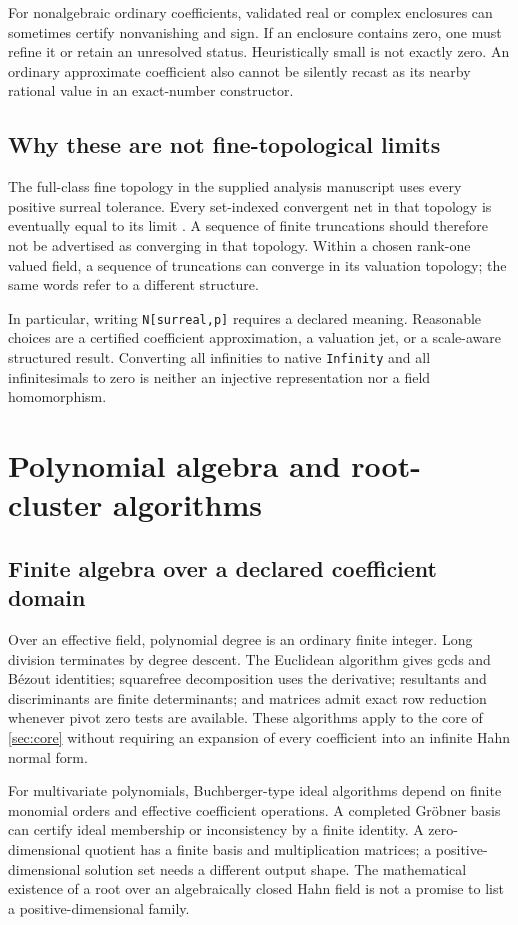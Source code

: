 \documentclass[11pt,letterpaper]{article}
\numberwithin{equation}{section}
\theoremstyle{definition}
\theoremstyle{remark}\newtheorem{remark}[theorem]{Remark}
\begin{document}
For nonalgebraic ordinary coefficients, validated real or complex enclosures
can sometimes certify nonvanishing and sign. If an enclosure contains zero,
one must refine it or retain an unresolved status. Heuristically small is not
exactly zero. An ordinary approximate coefficient also cannot be silently
recast as its nearby rational value in an exact-number constructor.

\subsection{Why these are not fine-topological limits}
The full-class fine topology in the supplied analysis manuscript uses every
positive surreal tolerance. Every set-indexed convergent net in that topology
is eventually equal to its limit \cite{SourceAnalysis}. A sequence of finite
truncations should therefore not be advertised as converging in that topology.
Within a chosen rank-one valued field, a sequence of truncations can converge
in its valuation topology; the same words refer to a different structure.

In particular, writing \texttt{N[surreal,p]} requires a declared meaning.
Reasonable choices are a certified coefficient approximation, a valuation jet,
or a scale-aware structured result. Converting all infinities to native
\texttt{Infinity} and all infinitesimals to zero is neither an injective
representation nor a field homomorphism.

\section{Polynomial algebra and root-cluster algorithms}
\label{sec:polynomials}

\subsection{Finite algebra over a declared coefficient domain}
Over an effective field, polynomial degree is an ordinary finite integer.
Long division terminates by degree descent. The Euclidean algorithm gives
gcds and B\'ezout identities; squarefree decomposition uses the derivative;
resultants and discriminants are finite determinants; and matrices admit
exact row reduction whenever pivot zero tests are available. These algorithms
apply to the core of \cref{sec:core} without requiring an expansion of every
coefficient into an infinite Hahn normal form.

For multivariate polynomials, Buchberger-type ideal algorithms depend on
finite monomial orders and effective coefficient operations. A completed
Gr\"obner basis can certify ideal membership or inconsistency by a finite
identity. A zero-dimensional quotient has a finite basis and multiplication
matrices; a positive-dimensional solution set needs a different output shape.
The mathematical existence of a root over an algebraically closed Hahn field
is not a promise to list a positive-dimensional family.
\end{document}
